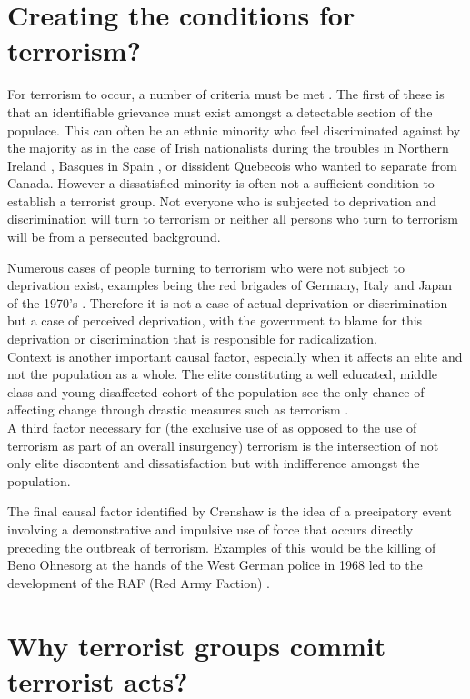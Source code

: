 \section{Creating the conditions for terrorism?}
For terrorism to occur, a number of criteria must be met \citep{crenshaw1981causes}. The first of these is that an identifiable grievance must exist amongst a detectable section of the populace. This can often be an ethnic minority who feel discriminated against by the majority as in the case of Irish nationalists during the troubles in Northern Ireland \citep{moxon1983nation}, Basques in Spain \citep{llera1993eta}, or dissident Quebecois \citep{ross1995rise} who wanted to separate from Canada. However a dissatisfied minority is often not a sufficient condition to establish a terrorist group. Not everyone who is subjected to deprivation and discrimination will turn to terrorism or neither all persons who turn to terrorism will be from a persecuted background. 

Numerous cases of people turning to terrorism who were not subject to deprivation exist, examples being the red brigades of Germany, Italy and Japan of the 1970's \citep{zwerman2000disappearing}. Therefore it is not a case of actual deprivation or discrimination but a case of perceived deprivation, with the government to blame for this deprivation or discrimination that is responsible for radicalization.
\\
Context is another important causal factor, especially when it affects an elite and not the population as a whole.  The elite constituting a well educated, middle class and young disaffected cohort of the population see the only chance of affecting change through drastic measures such as terrorism \citep{ronchey1979guns}.
\\
A third factor necessary for (the exclusive use of as opposed to the use of terrorism as part of an overall insurgency) terrorism is the intersection of not only elite discontent and dissatisfaction but with indifference amongst the population. 

The final causal factor identified by Crenshaw \citep{crenshaw1981causes} is the idea of a precipatory event involving a demonstrative and impulsive use of force that occurs directly preceding the outbreak of terrorism. Examples of this would be the killing of Beno Ohnesorg at the hands of the West German police in 1968 led to the development of the RAF (Red Army Faction) \citep{jazic2013rise}.

\section{Why terrorist groups commit terrorist acts?}

